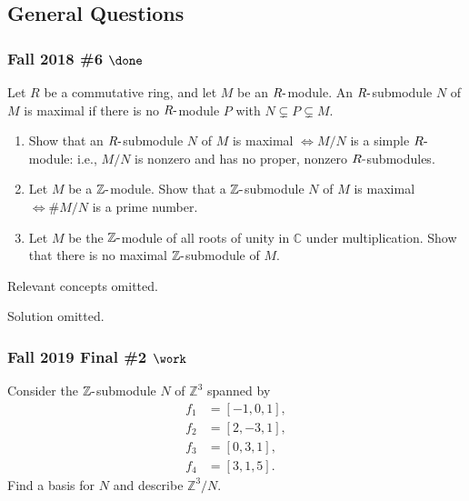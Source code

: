 \hypertarget{general-questions}{%
\subsection{General Questions}\label{general-questions}}

\hypertarget{fall-2018-6-done}{%
\subsubsection{\texorpdfstring{Fall 2018 \#6
\(\done\)}{Fall 2018 \#6 \textbackslash done}}\label{fall-2018-6-done}}

Let \(R\) be a commutative ring, and let \(M\) be an
\(R{\hbox{-}}\)module. An \(R{\hbox{-}}\)submodule \(N\) of \(M\) is
maximal if there is no \(R{\hbox{-}}\)module \(P\) with
\(N \subsetneq P \subsetneq M\).

\begin{enumerate}
\def\labelenumi{\alph{enumi}.}
\item
  Show that an \(R{\hbox{-}}\)submodule \(N\) of \(M\) is maximal
  \(\iff M /N\) is a simple \(R{\hbox{-}}\)module: i.e., \(M /N\) is
  nonzero and has no proper, nonzero \(R{\hbox{-}}\)submodules.
\item
  Let \(M\) be a \({\mathbb{Z}}{\hbox{-}}\)module. Show that a
  \({\mathbb{Z}}{\hbox{-}}\)submodule \(N\) of \(M\) is maximal
  \(\iff \#M /N\) is a prime number.
\item
  Let \(M\) be the \({\mathbb{Z}}{\hbox{-}}\)module of all roots of
  unity in \({\mathbb{C}}\) under multiplication. Show that there is no
  maximal \({\mathbb{Z}}{\hbox{-}}\)submodule of \(M\).
\end{enumerate}

Relevant concepts omitted.

Solution omitted.

\hypertarget{fall-2019-final-2-work}{%
\subsubsection{\texorpdfstring{Fall 2019 Final \#2
\(\work\)}{Fall 2019 Final \#2 \textbackslash work}}\label{fall-2019-final-2-work}}

Consider the \({\mathbb{Z}}{\hbox{-}}\)submodule \(N\) of
\({\mathbb{Z}}^3\) spanned by
\begin{align*}
f_1 &= [-1, 0, 1], \\
f_2 &= [2,-3,1], \\
f_3 &= [0, 3, 1], \\
f_4 &= [3,1,5]
.\end{align*}
Find a basis for \(N\) and describe \({\mathbb{Z}}^3/N\).

